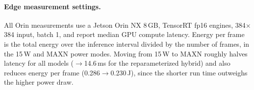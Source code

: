 \documentclass[10pt,twocolumn,letterpaper]{article}
\begin{document}
\paragraph{Edge measurement settings.}
All Orin measurements use a Jetson Orin NX 8\,GB, TensorRT fp16 engines, 384$\times$384 input, batch 1, and report median GPU compute latency. Energy per frame is the total energy over the inference interval divided by the number of frames, in the 15\,W and MAXN power modes. Moving from 15\,W to MAXN roughly halves latency for all models ($\to$14.6\,ms for the reparameterized hybrid) and also reduces energy per frame (0.286$\to$0.230\,J), since the shorter run time outweighs the higher power draw.
\end{document}
